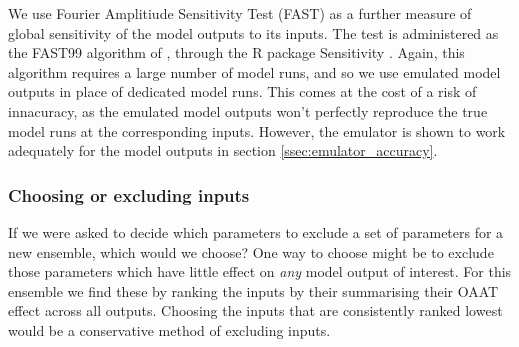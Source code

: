 \documentclass[gmd, manuscript]{copernicus}
\begin{document}
We use Fourier Amplitiude Sensitivity Test (FAST) as a further measure of global sensitivity of the model outputs to its inputs. The test is administered as the FAST99 algorithm of \cite{Saltelli1999}, through the R package Sensitivity \citep{Rsensitivity}. Again, this algorithm requires a large number of model runs, and so we use emulated model outputs in place of dedicated model runs. This comes at the cost of a risk of innacuracy, as the emulated model outputs won't perfectly reproduce the true model runs at the corresponding inputs. However, the emulator is shown to work adequately for the model outputs in section \ref{ssec:emulator_accuracy}. 

\subsubsection{Choosing or excluding inputs}


If we were asked to decide which parameters to exclude a set of parameters for a new ensemble, which would we choose? One way to choose might be to exclude those parameters which have little effect on \emph{any} model output of interest. For this ensemble we find these by ranking the inputs by their summarising their OAAT effect across all outputs. Choosing the inputs that are consistently ranked lowest would be a conservative method of excluding inputs.
\end{document}
